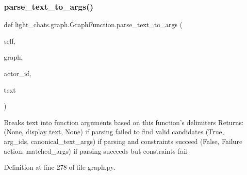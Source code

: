 \subsubsection{\texorpdfstring{parse\+\_\+text\+\_\+to\+\_\+args()}{parse\_text\_to\_args()}}
{\footnotesize\ttfamily def light\+\_\+chats.\+graph.\+Graph\+Function.\+parse\+\_\+text\+\_\+to\+\_\+args (\begin{DoxyParamCaption}\item[{}]{self,  }\item[{}]{graph,  }\item[{}]{actor\+\_\+id,  }\item[{}]{text }\end{DoxyParamCaption})}

\begin{DoxyVerb}Breaks text into function arguments based on this function's
delimiters
Returns:
(None, display text, None) if parsing failed to find valid candidates
(True, arg_ids, canonical_text_args) if parsing and constraints succeed
(False, Failure action, matched_args)
if parsing succeeds but constraints fail
\end{DoxyVerb}
 

Definition at line 278 of file graph.\+py.


